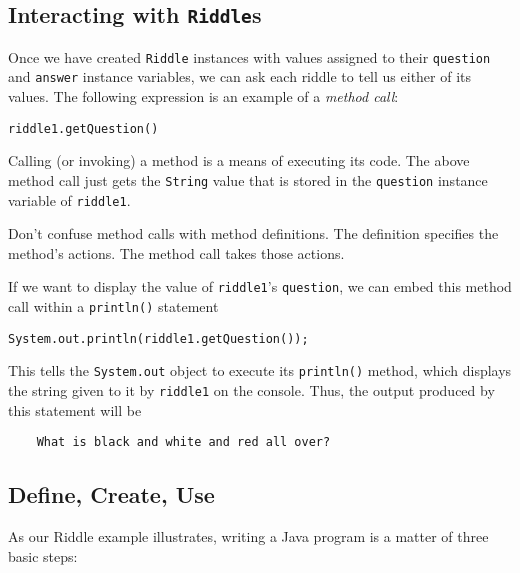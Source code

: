 \subsection{Interacting with {\tt Riddle}s }
\noindent Once we have created {\tt Riddle} instances with values
assigned to their {\tt question} and {\tt answer} instance variables,
we can ask each riddle to tell us either of its values.  The following
expression is an example of a {\it method call}:

\begin{jjjlisting}
\begin{lstlisting}
riddle1.getQuestion()
\end{lstlisting}
\end{jjjlisting}

\noindent Calling (or invoking) a method is a means of executing its code.  
The above method call just gets the {\tt String} value that is stored
in the {\tt question} instance variable of {\tt riddle1}.

 {Don't
confuse method calls with method definitions.  The definition specifies
the method's actions.  The method call takes those actions.}

\noindent If we want to display the value of {\tt riddle1}'s {\tt question}, 
we can embed this method call within a {\tt println()} statement

\begin{jjjlisting}
\begin{lstlisting}
System.out.println(riddle1.getQuestion());
\end{lstlisting}
\end{jjjlisting}

\noindent This tells the {\tt System.out} object to execute its
{\tt println()} method, which displays the string given to it by {\tt riddle1}
on the console. Thus, the output produced by this statement will be

\begin{jjjlisting}
\begin{lstlisting}
    What is black and white and red all over?
\end{lstlisting}
\end{jjjlisting}

\subsection{Define, Create, Use}
\label{sect-mantra}
\noindent As our Riddle example illustrates, writing a Java program is a 
matter of three basic steps:

